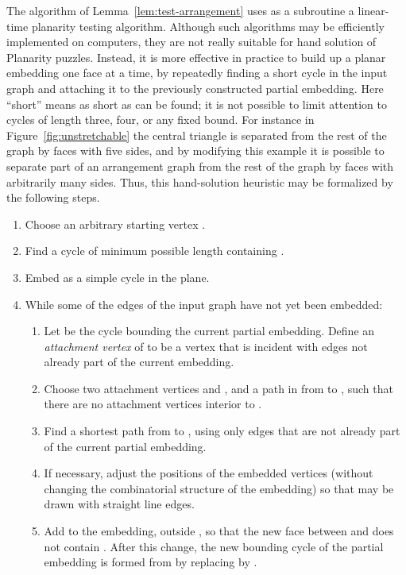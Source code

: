 \documentclass[oribibl]{llncs}
\begin{document}
The algorithm of Lemma~\ref{lem:test-arrangement} uses as a subroutine a linear-time planarity testing algorithm. Although such algorithms may be efficiently implemented on computers, they are not really suitable for hand solution of Planarity puzzles.
Instead, it is more effective in practice to build up a planar embedding one face at a time, by repeatedly finding a short cycle in the input graph and attaching it to the previously constructed partial embedding. Here ``short'' means as short as can be found; it is not possible to limit attention to cycles of length three, four, or any fixed bound. For instance in Figure~\ref{fig:unstretchable} the central triangle is separated from the rest of the graph by faces with five sides, and by modifying this example it is possible to separate part of an arrangement graph from the rest of the graph by faces with arbitrarily many sides.
Thus, this hand-solution heuristic may be formalized by the following steps.
\begin{enumerate}
\item Choose an arbitrary starting vertex .
\item Find a cycle  of minimum possible length containing .
\item Embed  as a simple cycle in the plane.
\item While some of the edges of the input graph have not yet been embedded:
\begin{enumerate}
\item Let  be the cycle bounding the current partial embedding. Define an \emph{attachment vertex} of  to be a vertex that is incident with edges not already part of the current embedding.
\item Choose two attachment vertices  and , and a path  in  from  to , such that there are no attachment vertices interior to .
\item Find a shortest path  from  to , using only edges that are not already part of the current partial embedding.
\item If necessary, adjust the positions of the embedded vertices (without changing the combinatorial structure of the embedding) so that  may be drawn with straight line edges.
\item Add  to the embedding, outside , so that the new face between  and  does not contain . After this change, the new bounding cycle  of the partial embedding is formed from  by replacing  by .
\end{enumerate}
\end{enumerate}
\end{document}
